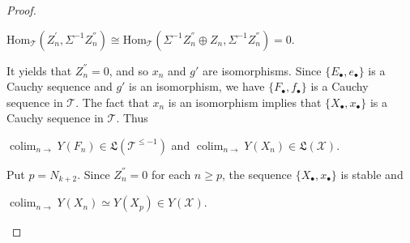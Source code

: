 \documentclass[11pt,a4paper]{amsart}
\numberwithin{equation}{section} \theoremstyle{plain}
\numberwithin{equation}{section} \theoremstyle{definition}
\begin{document}
\begin{proof}
\begin{center}
$\mathrm{Hom}_{\mathcal{T}}(Z_{n}^{'},\Sigma^{-1}Z_{n}^{''})\cong\mathrm{Hom}_{\mathcal{T}}(\Sigma^{-1}Z_{n}^{''}\oplus Z_{n},\Sigma^{-1}Z_{n}^{''})=0$.
\end{center}It yields that $Z_{n}^{''}=0$, and so $x_{n}$ and $g'$ are isomorphisms. Since $\{E_{\bullet},e_{\bullet}\}$ is a Cauchy sequence and $g'$ is an isomorphism, we have $\{F_{\bullet},f_{\bullet}\}$ is a Cauchy sequence in $\mathcal{T}$. The fact that $x_{n}$ is an isomorphism implies that $\{X_{\bullet},x_{\bullet}\}$ is a Cauchy sequence in $\mathcal{T}$. Thus
\begin{center}
$\displaystyle\operatorname*{colim}_{n\to}Y(F_{n})\in\mathfrak{L}(\mathcal{T}^{\leq-1})$ and $\displaystyle\operatorname*{colim}_{n\to}Y(X_{n})\in\mathfrak{L}(\mathcal{X})$.
\end{center}Put $p=N_{k+2}$. Since $Z_{n}^{''}=0$ for each $n\geq p$, the sequence $\{X_{\bullet},x_{\bullet}\}$ is stable and
\begin{center}
$\displaystyle\operatorname*{colim}_{n\to}Y(X_{n})\simeq Y(X_{p})\in Y(\mathcal{X})$.
\end{center}


\end{proof}
\end{document}
